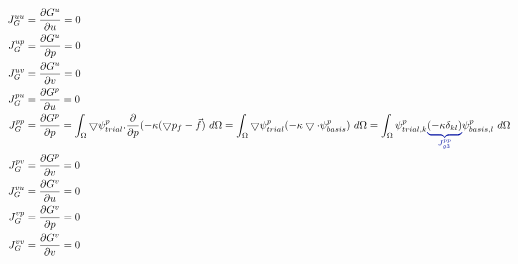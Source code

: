 \begin{align}
J_G^{uu} &= \frac{\partial G^u}{\partial u} = 0 \\
%
J_G^{up} &= \frac{\partial G^u}{\partial p} = 0 \\
%
J_G^{uv} &= \frac{\partial G^u}{\partial v} = 0 \\
%
J_G^{pu} &= \frac{\partial G^p}{\partial u} = 0 \\
%
J_G^{pp} &= \frac{\partial G^p}{\partial p} = \int_{\Omega} \bigtriangledown 
\psi_{trial}^p. \frac{\partial}{\partial p} (-\kappa (\bigtriangledown p_f - 
\vec{f}) \ d\Omega = \int_{\Omega} \bigtriangledown \psi_{trial}^ p (- \kappa 
\bigtriangledown \cdot \psi_{basis}^p) \ d\Omega = \int_{\Omega} 
\psi_{trial,k}^p \eqnannotate{\left(-\kappa \delta_{kl}\right)}{J_{g3}^{pp}} 
\psi_{basis,l}^p \ d\Omega \\
%
J_G^{pv} &= \frac{\partial G^p}{\partial v} = 0 \\
%
J_G^{vu} &= \frac{\partial G^v}{\partial u} = 0 \\
%
J_G^{vp} &= \frac{\partial G^v}{\partial p} = 0 \\
%
J_G^{vv} &= \frac{\partial G^v}{\partial v} = 0
\end{align} \\


